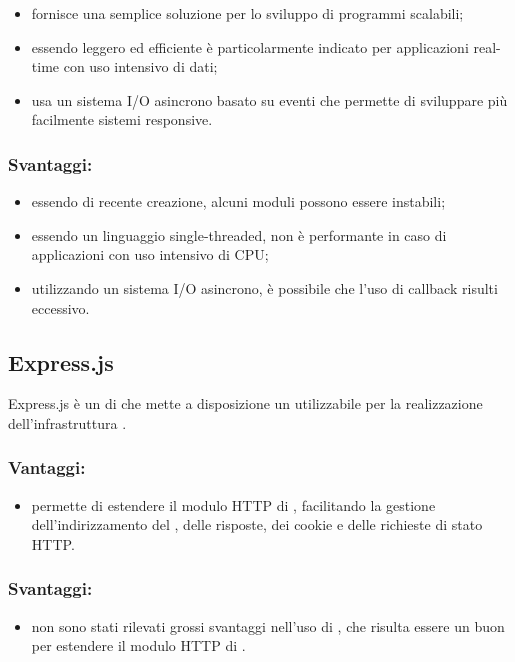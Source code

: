 \documentclass[a4paper, titlepage]{article}
\begin{document}
\begin{itemize}
	\item fornisce una semplice soluzione per lo sviluppo di programmi scalabili;
	\item essendo leggero ed efficiente è particolarmente indicato per applicazioni real-time con uso intensivo di dati;
	\item usa un sistema I/O asincrono basato su eventi che permette di sviluppare più facilmente sistemi responsive.
\end{itemize}

\subsubsection{Svantaggi:}

\begin{itemize}
	\item essendo di recente creazione, alcuni moduli possono essere instabili;
	\item essendo un linguaggio single-threaded, non è performante in caso di applicazioni con uso
	intensivo di CPU;
	\item utilizzando un sistema I/O asincrono, è possibile che l’uso di callback risulti eccessivo.
\end{itemize}

\subsection{Express.js}
Express.js è un  di  che mette a disposizione un  utilizzabile per la realizzazione dell’infrastruttura .

\subsubsection{Vantaggi:}

\begin{itemize}
	\item permette di estendere il modulo HTTP di , facilitando la gestione dell’indirizzamento del , delle risposte, dei cookie e delle richieste di stato HTTP.
\end{itemize}

\subsubsection{Svantaggi:}

\begin{itemize}
	\item non sono stati rilevati grossi svantaggi nell'uso di , che risulta essere un buon  per estendere il modulo HTTP di .
\end{itemize}
\end{document}
